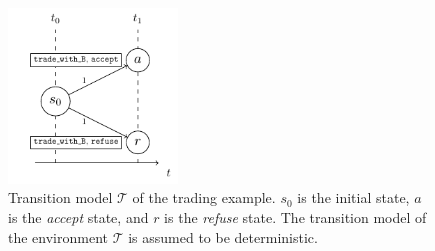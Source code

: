 \begin{figure}[h]
  \begin{center}
    \includegraphics[width=0.4\textwidth]{images/MasterThesisDirectedActionsDraw (2).pdf}
  \end{center}
  \caption{Transition model $\mathcal{T}$ of the trading example. $s_0$ is the initial state, $a$ is the \textit{accept} state, and $r$ is the \textit{refuse} state. The transition model of the environment $\mathcal{T}$ is assumed to be deterministic.}\label{fig:dir1}
\end{figure}





